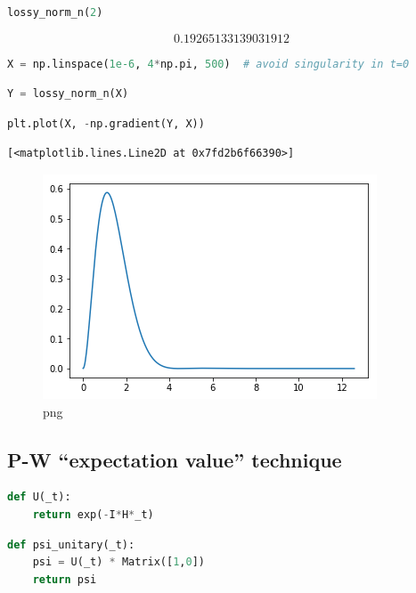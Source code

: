 \begin{lstlisting}[language=Python]
lossy_norm_n(2)
\end{lstlisting}

\[0.19265133139031912\]

\begin{lstlisting}[language=Python]
X = np.linspace(1e-6, 4*np.pi, 500)  # avoid singularity in t=0
\end{lstlisting}

\begin{lstlisting}[language=Python]
Y = lossy_norm_n(X)
\end{lstlisting}

\begin{lstlisting}[language=Python]
plt.plot(X, -np.gradient(Y, X))
\end{lstlisting}

\begin{lstlisting}
[<matplotlib.lines.Line2D at 0x7fd2b6f66390>]
\end{lstlisting}

\begin{figure}
\centering
\includegraphics{img/2ldetect/prob.png}
\caption{png}
\end{figure}

\hypertarget{p-w-expectation-value-technique}{%
\subsection{P-W ``expectation value''
technique}\label{p-w-expectation-value-technique}}

\begin{lstlisting}[language=Python]
def U(_t):
    return exp(-I*H*_t)
\end{lstlisting}

\begin{lstlisting}[language=Python]
def psi_unitary(_t):
    psi = U(_t) * Matrix([1,0])
    return psi
\end{lstlisting}

